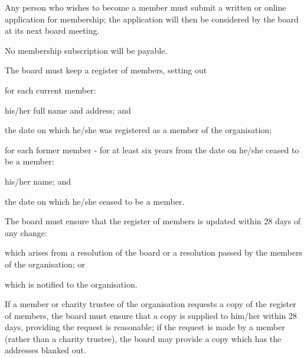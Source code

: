﻿\documentclass[a4paper,11pt,onecolumn ]{article}
\begin{document}

\begin{legal} %
\item Any person who wishes to become a member must submit a written or online application for membership; the application will then be considered by the board at its next board meeting.
\end{legal}



\begin{legal} %
\item No membership subscription will be payable.
\end{legal}


\begin{legal}
\item The board must keep a register of members, setting out 
    \begin{legal}
        \item for each current member:
            \begin{legal}
            \item his/her full name and address; and
            \item the date on which he/she was registered as a member of the organisation; 
            \end{legal}
        \item for each former member - for at least six years from the date on he/she ceased to be a member:
            \begin{legal}
            \item his/her name; and
            \item the date on which he/she ceased to be a member. 
            \end{legal}
    \end{legal}
\item The board must ensure that the register of members is updated within 28 days of any change:
    \begin{legal}
        \item which arises from a resolution of the board or a resolution passed by the members of the organisation; or 
        \item which is notified to the organisation.
    \end{legal}

\item If a member or charity trustee of the organisation requests a copy of the register of members, the board must ensure that a copy is supplied to him/her within 28 days, providing the request is reasonable; if the request is made by a member (rather than a charity trustee), the board may provide a copy which has the addresses blanked out.
\end{legal}
\end{document}
